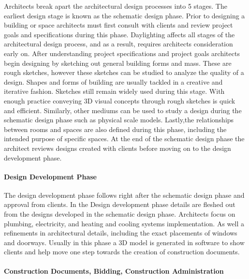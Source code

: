   Architects break apart the architectural design processes into 5 stages. 
  The earliest design stage is known as the schematic design phase.
  Prior to designing a building or space architects must first consult with clients and review project goals and specifications during this phase.
  Daylighting affects all stages of the architectural design process, and as a result, requires architects consideration early on.
  After understanding project specifications and project goals architects begin designing by sketching out general building forms and mass. These are rough sketches, however these sketches can be studied to analyze the quality of a design. Shapes and forms of building are usually tackled in a creative and iterative fashion. Sketches still remain widely used during this stage. With enough practice conveying 3D visual concepts through rough sketches is quick and efficient.
  Similarly, other mediums can be used to study a design during the schematic design phase such as physical scale models.
  Lastly,the relationships between rooms and spaces are also defined during this phase, including the intended purpose of specific spaces.
  At the end of the schematic design phase the architect reviews designs created with clients before moving on to the design development phase.

  \paragraph{Design Development Phase} 
  The design development phase follows right after the schematic design phase and approval from clients.
  In the Design development phase details are fleshed out from the designs developed in the schematic design phase.
  Architects focus on plumbing, electricity, and heating and cooling systems implementation.
  As well a refinements in architectural details, including the exact placements of windows and doorways.
  Usually in this phase a 3D model is generated in software to show clients and help move one step towards the creation of construction documents.

  \paragraph{Construction Documents, Bidding, Construction Administration} 

